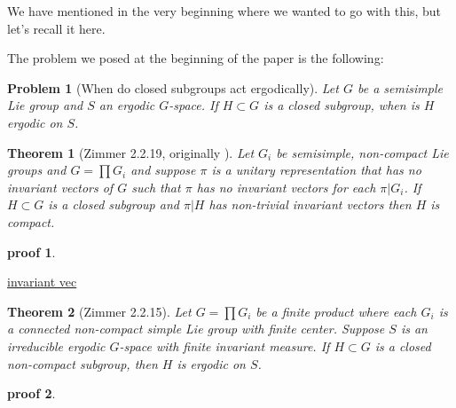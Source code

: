 \documentclass[
  12pt
]{article}
\theoremstyle{break}
\newtheorem{thm}{Theorem}
\newtheorem*{problem}{Problem}
\theoremstyle{plain}
\newtheorem*{pf}{proof}
\newcommand{\G}{\ensuremath{G}\xspace}
\newcommand{\mpi}{\ensuremath{\pi}\xspace}
\begin{document}
  We have mentioned in the very beginning where we wanted to go with this, but let's recall it here.

  The problem we posed at the beginning of the paper is the following:

  \begin{problem}[When do closed subgroups act ergodically]
    Let \G be a semisimple Lie group and $S$ an ergodic \G-space. If $H\subset G$ is a closed subgroup, when is $H$ ergodic on $S$.
  \end{problem}

  \begin{thm}[Zimmer 2.2.19, originally \citeauthor{Moore66}\cite{Moore66}]
    \label{thm:2.2.19}
     Let $G_i$ be semisimple, non-compact Lie groups and $G = \prod G_i$ and
     suppose \mpi is a unitary representation that has no invariant vectors of
     \G such that \mpi has no invariant vectors for each $\pi|G_i$. If $H
     \subset G$ is a closed subgroup and $\pi|H$ has non-trivial invariant
     vectors then $H$ is compact.
  \end{thm}

  \begin{pf}
  \end{pf}


  \hyperref[thm:2.2.17]{invariant vec}



  \begin{thm}[Zimmer 2.2.15]
    \label{thm:2.2.15}
    Let $G = \prod G_i$ be a finite product where each $G_i$ is a connected
    non-compact simple Lie group with finite center. Suppose $S$ is an
    irreducible ergodic \G-space with finite invariant measure. If $H \subset
    G$ is a closed non-compact subgroup, then $H$ is ergodic on $S$.
  \end{thm}

  \begin{pf}
     
  \end{pf}
\end{document}
